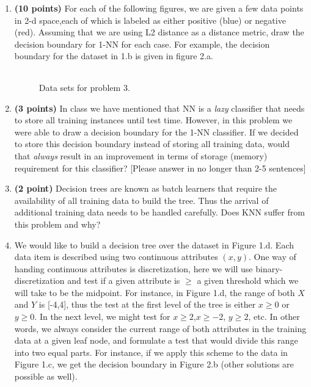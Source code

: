 \documentclass[11pt]{article}
\begin{document}
\begin{enumerate}
\item \textbf{(10 points)}
For each of the following figures, we are given a few data points in
2-d space,each of which is labeled as either positive (blue) or
negative (red). Assuming that we are using L2 distance as a distance
metric, draw the decision boundary for 1-NN for each case. For
example, the decision boundary for the dataset in 1.b is given in
figure 2.a.

\begin{figure*}[h!]
\centering
  \begin{tabular}{cccc}
  \end{tabular}
  \caption{Data sets for problem 3.}
 \end{figure*}


\item \textbf{(3 points)} In class we have mentioned that NN is a \emph{lazy}
classifier that needs to store all training instances until test
time. However,  in this problem we were able to draw a decision
boundary for the 1-NN classifier. If we decided to store this
decision boundary instead of storing all training data, would that
\emph{always} result in an improvement in terms of storage  (memory)
requirement for this classifier?  [Please answer in no longer than
2-5 sentences]

\item \textbf{(2 point)}
Decision trees are known as batch learners that require the
availability of all training data to build the tree. Thus the
arrival of additional training data needs to be handled carefully.
Does KNN suffer from this problem and why?


\item
We would like to build a decision tree over the dataset in Figure
1.d. Each data item is described using two continuous attributes
$(x,y)$. One way of handing continuous attributes is discretization,
here we will use binary-discretization and test if a given attribute
is $\geq$ a given threshold which we will take to be the midpoint.
For instance, in Figure 1.d, the range of both $X$ and $Y$ is
[-4,4], thus the test at the first level of the tree is either $x
\geq 0$ or $y \geq 0$. In the next level, we might test for $x \geq
2$,$x \geq -2$, $y \geq 2$, etc.  In other words, we  always
consider the current range of both attributes in the training data
at a given leaf node, and formulate a test that would divide this
range into two equal parts.  For instance, if we apply this scheme
to the data in Figure 1.c, we get the decision boundary in Figure
2.b (other solutions are possible as well).


\end{enumerate}
\end{document}
